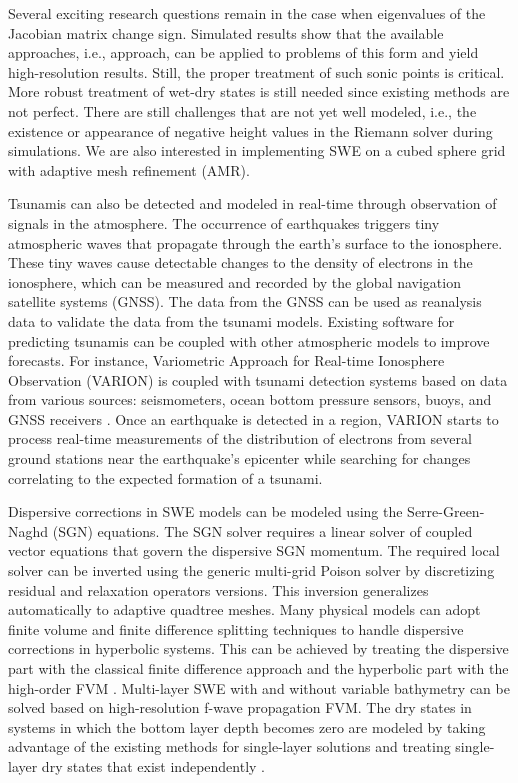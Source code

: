 \documentclass[9pt,a4paper]{article}
\begin{document}
	Several exciting research questions remain in the case when eigenvalues of the Jacobian matrix change sign. Simulated results show that the available approaches, i.e.,    \citet{ba-le-mi-ro:2003} approach, can be applied to problems of this form and yield high-resolution results. Still, the proper treatment of such sonic points is critical.
	More robust treatment of wet-dry states is still needed since existing methods are not perfect. There are still challenges that are not yet well modeled, i.e., the existence or appearance of negative height values in the Riemann solver during simulations.
	We are also interested in implementing SWE on a cubed sphere grid with adaptive mesh refinement (AMR).  
	
	
	Tsunamis can also be detected and modeled in real-time through observation of signals in the atmosphere. The occurrence of earthquakes triggers tiny atmospheric waves that propagate through the earth's surface to the ionosphere. These tiny waves cause detectable changes to the density of electrons in the ionosphere, which can be measured and recorded by the global navigation satellite systems (GNSS).  The data from the GNSS can be used as reanalysis data to validate the data from the tsunami models. Existing software for predicting tsunamis can be coupled with other atmospheric models to improve forecasts. For instance, Variometric Approach for Real-time Ionosphere Observation (VARION)  is coupled with tsunami detection systems based on data from various sources: seismometers, ocean bottom pressure sensors, buoys, and GNSS receivers \citep{savastano2017real}. Once an earthquake is detected in a region, VARION starts to process real-time measurements of the distribution of electrons from several ground stations near the earthquake's epicenter while searching for changes correlating to the expected formation of a tsunami.
	
	
	Dispersive corrections in SWE models can be modeled using the Serre-Green-Naghd (SGN) equations. The SGN solver requires a linear solver of coupled vector equations that govern the dispersive SGN momentum.  The required local solver can be inverted using the generic multi-grid Poison solver by discretizing residual and relaxation operators versions. This inversion generalizes automatically to adaptive quadtree meshes. Many physical models can adopt finite volume and finite difference splitting techniques to handle dispersive corrections in hyperbolic systems.  This can be achieved by treating the dispersive part with the classical finite difference approach and the hyperbolic part with the high-order FVM \citep{la-bo:2009,po:2020,po:2015}. 
	Multi-layer SWE with and without variable bathymetry can be solved based on high-resolution f-wave propagation FVM. The dry states in systems in which the bottom layer depth becomes zero are modeled by taking advantage of the existing methods for single-layer solutions and treating single-layer dry states that exist independently \citep{mandli2013numerical}.
	
\end{document}
